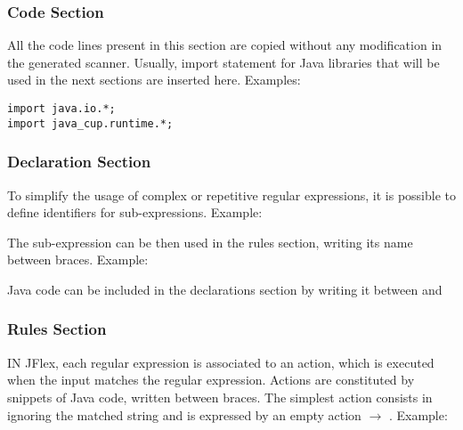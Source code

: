 \subsubsection{Code Section}
All the code lines present in this section are copied without any modification in the generated scanner.
Usually, import statement for Java libraries that will be used in the next sections are inserted here.
Examples:
\begin{lstlisting}
import java.io.*;
import java_cup.runtime.*;
\end{lstlisting}

\subsubsection{Declaration Section}
To simplify the usage of complex or repetitive regular expressions, it is possible to define identifiers for sub-expressions.
Example: 

The sub-expression can be then used in the rules section, writing its name between braces.
Example: 

Java code can be included in the declarations section by writing it between \code{\%\{} and \code{\%\}}

\subsubsection{Rules Section}
IN JFlex, each regular expression is associated to an action, which is executed when the input matches the regular expression.
Actions are constituted by snippets of Java code, written between braces.
The simplest action consists in ignoring the matched string and is expressed by an empty action $\to$ \code{\{;\}}.
Example: 

